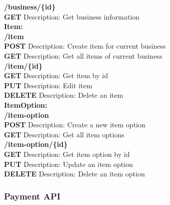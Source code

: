 \documentclass[11pt,a4paper,pdftex]{article}
\begin{document}
\hspace*{1em}\textbf{/business/\{id\}}\\
\hspace*{2em}\textbf{GET} Description: Get business information\\

\textbf{Item:}\\
\hspace*{1em}\textbf{/item}\\
\hspace*{2em}\textbf{POST} Description: Create item for current business\\
\hspace*{2em}\textbf{GET} Description: Get all items of current business\\

\hspace*{1em}\textbf{/item/\{id\}}\\
\hspace*{2em}\textbf{GET} Description: Get item by id\\
\hspace*{2em}\textbf{PUT} Description: Edit item\\
\hspace*{2em}\textbf{DELETE} Description: Delete an item\\

\textbf{ItemOption:}\\
\hspace*{1em}\textbf{/item-option}\\
\hspace*{2em}\textbf{POST} Description: Create a new item option\\
\hspace*{2em}\textbf{GET} Description: Get all item options\\

\hspace*{1em}\textbf{/item-option/\{id\}}\\
\hspace*{2em}\textbf{GET} Description: Get item option by id\\
\hspace*{2em}\textbf{PUT} Description: Update an item option\\
\hspace*{2em}\textbf{DELETE} Description: Delete an item option\\

\subsubsection{Payment API}
\end{document}
